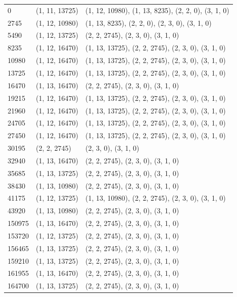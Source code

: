 \begin{center}
\begin{longtable}{|l|l|l|}
0 & (1, 11, 13725) & (1, 12, 10980), (1, 13, 8235), (2, 2, 0), (3, 1, 0) \\
2745 & (1, 12, 10980) & (1, 13, 8235), (2, 2, 0), (2, 3, 0), (3, 1, 0) \\
5490 & (1, 12, 13725) & (2, 2, 2745), (2, 3, 0), (3, 1, 0) \\
8235 & (1, 12, 16470) & (1, 13, 13725), (2, 2, 2745), (2, 3, 0), (3, 1, 0) \\
10980 & (1, 12, 16470) & (1, 13, 13725), (2, 2, 2745), (2, 3, 0), (3, 1, 0) \\
13725 & (1, 12, 16470) & (1, 13, 13725), (2, 2, 2745), (2, 3, 0), (3, 1, 0) \\
16470 & (1, 13, 16470) & (2, 2, 2745), (2, 3, 0), (3, 1, 0) \\
19215 & (1, 12, 16470) & (1, 13, 13725), (2, 2, 2745), (2, 3, 0), (3, 1, 0) \\
21960 & (1, 12, 16470) & (1, 13, 13725), (2, 2, 2745), (2, 3, 0), (3, 1, 0) \\
24705 & (1, 12, 16470) & (1, 13, 13725), (2, 2, 2745), (2, 3, 0), (3, 1, 0) \\
27450 & (1, 12, 16470) & (1, 13, 13725), (2, 2, 2745), (2, 3, 0), (3, 1, 0) \\
30195 & (2, 2, 2745) & (2, 3, 0), (3, 1, 0) \\
32940 & (1, 13, 16470) & (2, 2, 2745), (2, 3, 0), (3, 1, 0) \\
35685 & (1, 13, 13725) & (2, 2, 2745), (2, 3, 0), (3, 1, 0) \\
38430 & (1, 13, 10980) & (2, 2, 2745), (2, 3, 0), (3, 1, 0) \\
41175 & (1, 12, 13725) & (1, 13, 10980), (2, 2, 2745), (2, 3, 0), (3, 1, 0) \\
43920 & (1, 13, 10980) & (2, 2, 2745), (2, 3, 0), (3, 1, 0) \\
150975 & (1, 13, 16470) & (2, 2, 2745), (2, 3, 0), (3, 1, 0) \\
153720 & (1, 12, 13725) & (2, 2, 2745), (2, 3, 0), (3, 1, 0) \\
156465 & (1, 13, 13725) & (2, 2, 2745), (2, 3, 0), (3, 1, 0) \\
159210 & (1, 13, 13725) & (2, 2, 2745), (2, 3, 0), (3, 1, 0) \\
161955 & (1, 13, 16470) & (2, 2, 2745), (2, 3, 0), (3, 1, 0) \\
164700 & (1, 13, 13725) & (2, 2, 2745), (2, 3, 0), (3, 1, 0) \\
\end{longtable}
\end{center}
